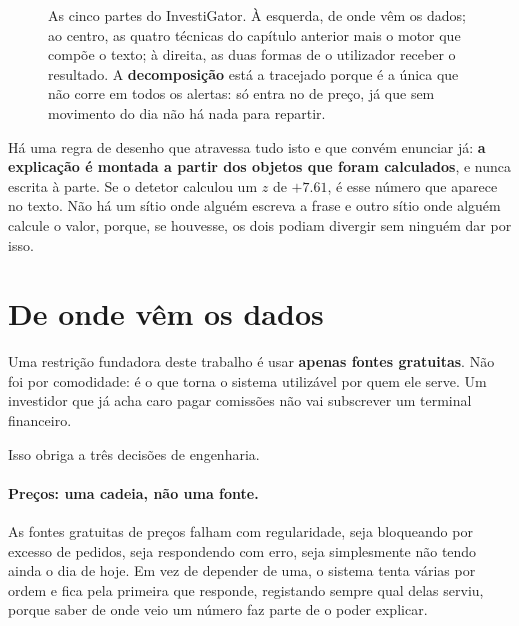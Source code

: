 \begin{figure}[ht]
\caption[Arquitetura do sistema]{As cinco partes do InvestiGator. À esquerda, de onde vêm os dados;
ao centro, as quatro técnicas do capítulo anterior mais o motor que compõe o texto; à direita, as
duas formas de o utilizador receber o resultado. A \textbf{decomposição} está a tracejado porque é
a única que não corre em todos os alertas: só entra no de preço, já que sem movimento do dia não
há nada para repartir.}
\label{fig:arquitetura}
\end{figure}

Há uma regra de desenho que atravessa tudo isto e que convém enunciar já: \textbf{a explicação é
montada a partir dos objetos que foram calculados}, e nunca escrita à parte. Se o detetor calculou
um $z$ de $+7.61$, é esse número que aparece no texto. Não há um sítio onde alguém escreva a frase e
outro sítio onde alguém calcule o valor, porque, se houvesse, os dois podiam divergir sem
ninguém dar por isso.

\section{De onde vêm os dados}
\label{sec:sis_dados}

Uma restrição fundadora deste trabalho é usar \textbf{apenas fontes gratuitas}. Não foi por
comodidade: é o que torna o sistema utilizável por quem ele serve. Um investidor que já acha caro
pagar comissões não vai subscrever um terminal financeiro.

Isso obriga a três decisões de engenharia.

\paragraph{Preços: uma cadeia, não uma fonte.}
As fontes gratuitas de preços falham com regularidade, seja bloqueando por excesso de pedidos, seja
respondendo com erro, seja simplesmente não tendo ainda o dia de hoje. Em vez de depender de uma, o
sistema tenta várias por ordem e fica pela primeira que responde, registando sempre qual delas
serviu, porque saber de onde veio um número faz parte de o poder explicar.

